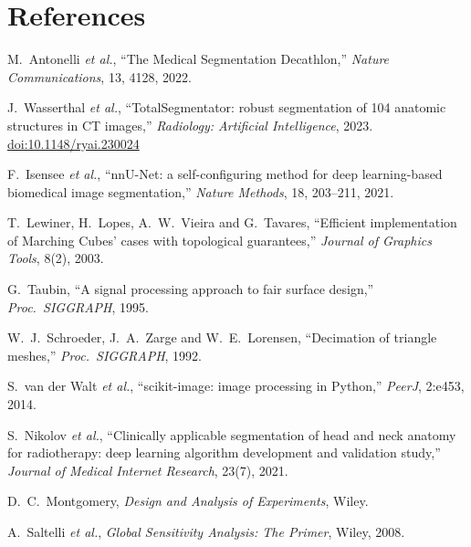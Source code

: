 \documentclass[10pt,a4paper]{article}
\begin{document}
\section*{References}
{\small
\begin{enumerate}[label={[\arabic*]},leftmargin=*,itemsep=1pt]
\item\label{r:msd} M.~Antonelli \emph{et al.}, ``The Medical Segmentation Decathlon,'' \emph{Nature Communications}, 13, 4128, 2022.
\item\label{r:tspaper} J.~Wasserthal \emph{et al.}, ``TotalSegmentator: robust segmentation of 104 anatomic structures in CT images,'' \emph{Radiology: Artificial Intelligence}, 2023. \href{https://doi.org/10.1148/ryai.230024}{doi:10.1148/ryai.230024}
\item\label{r:nnunet} F.~Isensee \emph{et al.}, ``nnU-Net: a self-configuring method for deep learning-based biomedical image segmentation,'' \emph{Nature Methods}, 18, 203--211, 2021.
\item\label{r:lewiner} T.~Lewiner, H.~Lopes, A.~W.~Vieira and G.~Tavares, ``Efficient implementation of Marching Cubes' cases with topological guarantees,'' \emph{Journal of Graphics Tools}, 8(2), 2003.
\item\label{r:taubin} G.~Taubin, ``A signal processing approach to fair surface design,'' \emph{Proc.\ SIGGRAPH}, 1995.
\item\label{r:schroeder} W.~J.~Schroeder, J.~A.~Zarge and W.~E.~Lorensen, ``Decimation of triangle meshes,'' \emph{Proc.\ SIGGRAPH}, 1992.
\item\label{r:skimage} S.~van der Walt \emph{et al.}, ``scikit-image: image processing in Python,'' \emph{PeerJ}, 2:e453, 2014.
\item\label{r:nsd} S.~Nikolov \emph{et al.}, ``Clinically applicable segmentation of head and neck anatomy for radiotherapy: deep learning algorithm development and validation study,'' \emph{Journal of Medical Internet Research}, 23(7), 2021.
\item\label{r:montgomery} D.~C.~Montgomery, \emph{Design and Analysis of Experiments}, Wiley.
\item\label{r:saltelli} A.~Saltelli \emph{et al.}, \emph{Global Sensitivity Analysis: The Primer}, Wiley, 2008.
\end{enumerate}
}
\end{document}
